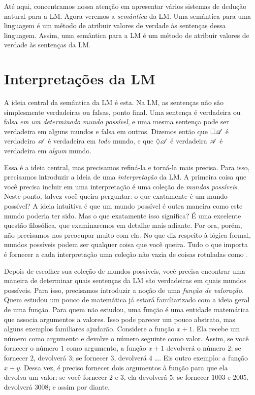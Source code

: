 Até aqui, concentramos nossa atenção em apresentar vários sistemas de dedução natural para a LM. Agora veremos a \emph{semântica} da LM. Uma semântica para uma linguagem é um método de atribuir valores de verdade às sentenças dessa linguagem. Assim, uma semântica para a LM é um método de atribuir valores de verdade às sentenças da LM.

\section{Interpretações da LM}

A ideia central da semântica da LM é esta. Na LM, as sentenças não são simplesmente verdadeiras ou falsas, ponto final. Uma sentença é verdadeira ou falsa \emph{em um determinado mundo possível}, e uma mesma sentença pode ser verdadeira em alguns mundos e falsa em outros. Dizemos então que $\Box \mathscr{A}$ é verdadeira \ifeff{} $\mathscr{A}$ é verdadeira em \emph{todo} mundo, e que $\Diamond\mathscr{A}$ é verdadeira \ifeff{} $\mathscr{A}$ é verdadeira em \emph{algum} mundo.

Essa é a ideia central, mas precisamos refiná-la e torná-la mais precisa. Para isso, precisamos introduzir a ideia de uma \emph{interpretação} da LM. A primeira coisa que você precisa incluir em uma interpretação é uma coleção de \emph{mundos possíveis}. Neste ponto, talvez você queira perguntar: o que exatamente é um mundo possível? A ideia intuitiva é que um mundo possível é outra maneira como este mundo poderia ter sido. Mas o que exatamente isso significa? É uma excelente questão filosófica, que examinaremos em detalhe mais adiante. Por ora, porém, não precisamos nos preocupar muito com ela. No que diz respeito à lógica formal, mundos possíveis podem ser qualquer coisa que você queira. Tudo o que importa é fornecer a cada interpretação uma coleção não vazia de coisas rotuladas como .

Depois de escolher sua coleção de mundos possíveis, você precisa encontrar uma maneira de determinar quais sentenças da LM são verdadeiras em quais mundos possíveis. Para isso, precisamos introduzir a noção de uma \emph{função de valoração}. Quem estudou um pouco de matemática já estará familiarizado com a ideia geral de uma função. Para quem não estudou, uma função é uma entidade matemática que associa argumentos a valores. Isso pode parecer um pouco abstrato, mas alguns exemplos familiares ajudarão. Considere a função $x+1$. Ela recebe um número como argumento e devolve o número seguinte como valor. Assim, se você fornecer o número $1$ como argumento, a função $x+1$ devolverá o número $2$; se fornecer $2$, devolverá $3$; se fornecer $3$, devolverá $4$ \dots. Eis outro exemplo: a função $x+y$. Dessa vez, é preciso fornecer dois argumentos à função para que ela devolva um valor: se você fornecer $2$ e $3$, ela devolverá $5$; se fornecer $1003$ e $2005$, devolverá $3008$; e assim por diante.


